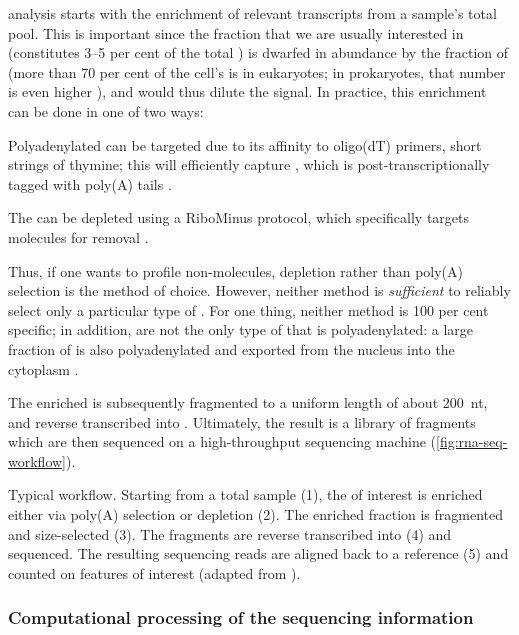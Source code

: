 \rnaseq analysis starts with the enrichment of relevant transcripts from a
sample’s total \rna pool. This is important since the \rna fraction that we are
usually interested in (\mrna constitutes \numrange{3}{5} per cent of the total
\rna \citep{Alberts:2002}) is dwarfed in abundance by the fraction of \rrna
(more than \num{70} per cent of the cell’s \rna is \rrna in eukaryotes; in
prokaryotes, that number is even higher \citep{Sittman:1999}), and would thus
dilute the signal. In practice, this enrichment can be done in one of two ways:
\begin{enumerate*}
    \item Polyadenylated \rna can be targeted due to its affinity to oligo(dT)
        primers, short strings of thymine; this will efficiently capture \mrna,
        which is post-transcriptionally \threep tagged with poly(A)
        tails \citep{Mortazavi:2008}.
    \item The \rna can be \rrna depleted using a RiboMinus protocol, which
        specifically targets \rrna molecules for removal \citep{Cui:2010}.
\end{enumerate*}
Thus, if one wants to profile non-\mrna molecules, \rrna depletion rather than
poly(A) selection is the method of choice. However, neither method is
\emph{sufficient} to reliably select only a particular type of \rna. For one
thing, neither method is \num{100} per cent specific; in addition, \mrna[s] are
not the only type of \rna that is polyadenylated: a large fraction of \ncrna is
also polyadenylated and exported from the nucleus into the cytoplasm
\citep{Cheng:2005}.

The enriched \rna is subsequently fragmented to a uniform length of about
\SI{200}{nt}, and reverse transcribed into \cdna. Ultimately, the result is a
\cdna library of fragments which are then sequenced on a high-throughput
sequencing machine (\cref{fig:rna-seq-workflow}).

    {Typical  workflow.}
    {Starting from a total \rna sample (\num{1}), the \rna of interest is
    enriched either via poly(A) selection or \rrna depletion (\num{2}). The
    enriched fraction is fragmented and size-selected (\num{3}). The fragments
    are reverse transcribed into \cdna (\num{4}) and sequenced. The resulting
    sequencing reads are aligned back to a reference (\num{5}) and counted on
    features of interest (adapted from \citet{Mortazavi:2008}).}

\subsubsection{Computational processing of the sequencing information}

